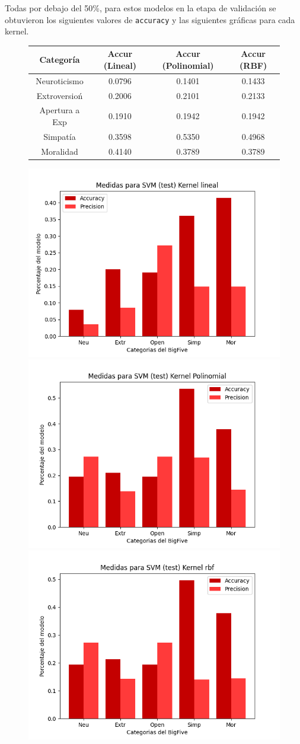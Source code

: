 \documentclass[10pt, a4paper]{article}
\begin{document}
            Todas por debajo del 50\%, para estos modelos en la etapa de validaci\'on se obtuvieron los 
            siguientes valores de \texttt{accuracy} y las siguientes gr\'aficas para cada kernel. \\ 

            \begin{figure}[H]
                \centering
                \begin{tabular}{|c|c|c|c|}

                    \hline Categor\'ia & Accur (Lineal) & Accur (Polinomial) & Accur (RBF) \\  
                    \hline Neuroticismo             & 0.0796 & 0.1401  &  0.1433\\
                    \hline Extroversio\'n           & 0.2006 & 0.2101  &  0.2133\\
                    \hline Apertura a Exp  & 0.1910 & 0.1942  &  0.1942\\
                    \hline Simpat\'ia               & 0.3598 & 0.5350  &  0.4968\\
                    \hline Moralidad                & 0.4140 & 0.3789  &  0.3789\\
                    \hline
                \end{tabular}
            \end{figure}

            \begin{figure}[H]
                \centering
                \includegraphics[width = 0.3\linewidth]{final_lineal10.png}
                \includegraphics[width = 0.3\linewidth]{final_polinomial10.png}
                \includegraphics[width = 0.3\linewidth]{final_rbf10.png}

            \end{figure}
\end{document}
